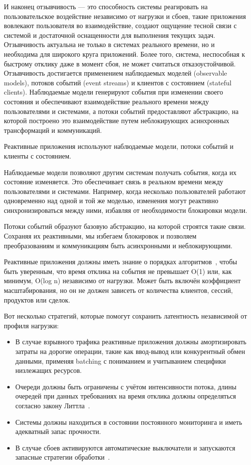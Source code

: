 И наконец отзывчивость --- это способность системы реагировать на пользовательское воздействие независимо от нагрузки и сбоев, такие приложения вовлекают пользователя во взаимодействие, создают ощущение тесной связи с системой и достаточной оснащенности для выполнения текущих задач. Отзывчивость актуальна не только в системах реального времени, но и необходима для широкого круга приложений. Более того, система, неспособная к быстрому отклику даже в момент сбоя, не может считаться отказоустойчивой. Отзывчивость достигается применением наблюдаемых моделей (observable models), потоков событий (event streams) и клиентов с состоянием (stateful clients). Наблюдаемые модели генерируют события при изменении своего состояния и обеспечивают взаимодействие реального времени между пользователями и системами, а потоки событий предоставляют абстракцию, на которой построено это взаимодействие путем неблокирующих асинхронных трансформаций и коммуникаций.

Реактивные приложения используют наблюдаемые модели, потоки событий и клиенты с состоянием.

Наблюдаемые модели позволяют другим системам получать события, когда их состояние изменяется. Это обеспечивает связь в реальном времени между пользователями и системами. Например, когда несколько пользователей работают одновременно над одной и той же моделью, изменения могут реактивно синхронизироваться между ними, избавляя от необходимости блокировки модели.

Потоки событий образуют базовую абстракцию, на которой строятся такие связи. Сохраняя их реактивными, мы избегаем блокировок и позволяем преобразованиям и коммуникациям быть асинхронными и неблокирующими.

Реактивные приложения должны иметь знание о порядках алгоритмов~\cite{algh_complexity}, чтобы быть уверенным, что время отклика на события не превышает O(1) или, как минимум, O(log n) независимо от нагрузки. Может быть включён коэффициент масштабирования, но он не должен зависеть от количества клиентов, сессий, продуктов или сделок.

Вот несколько стратегий, которые помогут сохранить латентность независимой от профиля нагрузки:

\begin{itemize}
  \item В случае взрывного трафика реактивные приложения должны амортизировать затраты на дорогие операции, такие как ввод-вывод или конкурентный обмен данными, применяя batching с пониманием и учитыванием специфики низлежащих ресурсов.
  \item Очереди должны быть ограничены с учётом интенсивности потока, длины очередей при данных требованиях на время отклика должны определяться согласно закону Литтла~\cite{little_law}.
  \item Системы должны находиться в состоянии постоянного мониторинга и иметь адекватный запас прочности.
  \item В случае сбоев активируются автоматические выключатели и запускаются запасные стратегии обработки~\cite{circuit_breaker_design_pattern}.
\end{itemize}

